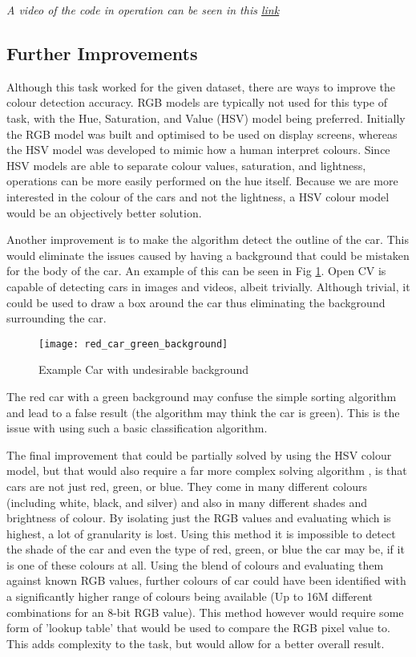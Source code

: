 \documentclass[conference]{IEEEtran}
\begin{document}
\textit{A video of the code in operation can be seen in this \href{https://youtu.be/hWfO3ubkQVc}{link}}


\subsection{Further Improvements}
Although this task worked for the given dataset, there are ways to improve the colour detection accuracy. RGB models are typically not used for this type of task, with the Hue, Saturation, and Value (HSV) model being preferred. Initially the RGB model was built and optimised to be used on display screens, whereas the HSV model was developed to mimic how a human interpret colours. Since HSV models are able to separate colour values, saturation, and lightness, operations can be more easily performed on the hue itself. Because we are more interested in the colour of the cars and not the lightness, a HSV colour model would be an objectively better solution. \cite{ref:HSV_vs_RGB}

Another improvement is to make the algorithm detect the outline of the car. This would eliminate the issues caused by having a background that could be mistaken for the body of the car. An example of this can be seen in Fig \ref{fig:red_car_green_background}. Open CV is capable of detecting cars in images and videos, albeit trivially. Although trivial, it could be used to draw a box around the car thus eliminating the background surrounding the car. \cite{ref:Vehicle_detection_in_python} 

\begin{figure}
\centerline{\texttt{[image: red\_car\_green\_background]}}
\caption{Example Car with undesirable background}
\label{fig:red_car_green_background}
\end{figure}

The red car with a green background may confuse the simple sorting algorithm and lead to a false result (the algorithm may think the car is green). This is the issue with using such a basic classification algorithm.

The final improvement that could be partially solved by using the HSV colour model, but that would also require a far more complex solving algorithm \cite{ref:colour_sorting}, is that cars are not just red, green, or blue. They come in many different colours (including white, black, and silver) and also in many different shades and brightness of colour. By isolating just the RGB values and evaluating which is highest, a lot of granularity is lost. Using this method it is impossible to detect the shade of the car and even the type of red, green, or blue the car may be, if it is one of these colours at all. Using the blend of colours and evaluating them against known RGB values, further colours of car could have been identified with a significantly higher range of colours being available (Up to 16M different combinations for an 8-bit RGB value). This method however would require some form of 'lookup table' that would be used to compare the RGB pixel value to. This adds complexity to the task, but would allow for a better overall result.
\end{document}
